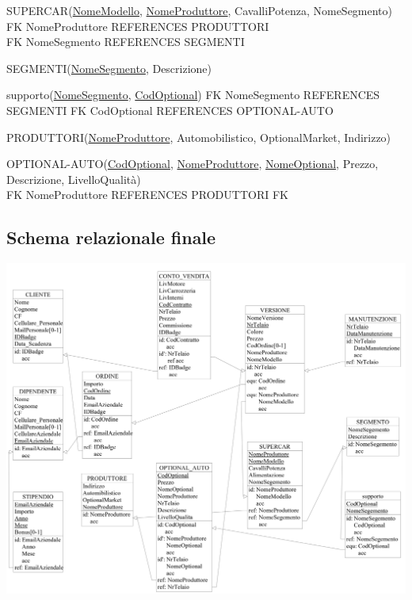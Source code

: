 \documentclass[11pt]{article}
\begin{document}
\begin{flushleft}
SUPERCAR(\underline{NomeModello}, \underline{NomeProduttore}, CavalliPotenza, NomeSegmento)\\
FK NomeProduttore REFERENCES PRODUTTORI\\
FK NomeSegmento REFERENCES SEGMENTI
\end{flushleft}

\begin{flushleft}
SEGMENTI(\underline{NomeSegmento}, Descrizione)
\end{flushleft}

\begin{flushleft}
supporto(\underline{NomeSegmento}, \underline{CodOptional})
FK NomeSegmento REFERENCES SEGMENTI
FK CodOptional REFERENCES OPTIONAL-AUTO
\end{flushleft}

\begin{flushleft}
PRODUTTORI(\underline{NomeProduttore}, Automobilistico, OptionalMarket, Indirizzo)
\end{flushleft}

\begin{flushleft}
OPTIONAL-AUTO(\underline{CodOptional}, \underline{NomeProduttore}, \underline{NomeOptional}, Prezzo, Descrizione, LivelloQualità)\\
FK NomeProduttore REFERENCES PRODUTTORI
FK 
\end{flushleft}

\normalsize

\newpage 

\subsection{Schema relazionale finale}

\begin{center}
    \includegraphics[height=\linewidth, angle=90]{images/fullSchemes/relazionale.jpeg}
\end{center}
\end{document}
